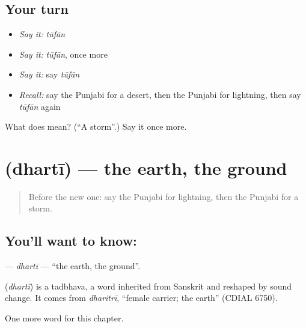 \subsection*{Your turn}
\begin{itemize}
\raggedright
  \item \emph{Say it:} \emph{tūfān}
  \item \emph{Say it:} \emph{tūfān}, once more
  \item \emph{Say it:} say \emph{tūfān}
  \item \emph{Recall:} say the Punjabi for a desert, then the Punjabi for lightning, then say \emph{tūfān} again
\end{itemize}

\begin{tcolorbox}[breakable,colback=teal!4,colframe=teal!35!black,title={Before you move on}]
What does  mean? (\textquotedblleft{}A storm\textquotedblright{}.) Say it once more.
\end{tcolorbox}
\section[\texorpdfstring{\pa{ਧਰਤੀ} (dhartī)}{ਧਰਤੀ (dhartī)}]{ (dhartī) — the earth, the ground}

\label{lesson:PA-C128-dharti}



\begin{quote}
Before the new one: say the Punjabi for lightning, then the Punjabi for a storm.
\end{quote}

\subsection*{You'll want to know: }
\textbf{} — \emph{dhartī} — \textquotedblleft{}the earth, the ground\textquotedblright{}.

\begin{cousinweb}
\textbf{} (\emph{dhartī}) is a tadbhava, a word inherited from Sanskrit and reshaped by sound change. It comes from \emph{dharitrī}, \textquotedblleft{}female carrier; the earth\textquotedblright{} (CDIAL 6750).
\end{cousinweb}

\begin{grammarlens}[title={What you've built}]
One more word for this chapter.
\end{grammarlens}

